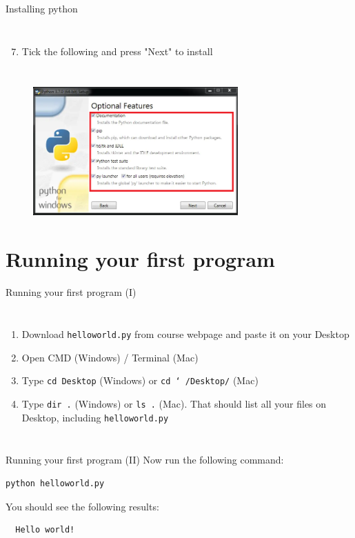 \documentclass[10pt,xcolor={table,dvipsnames},t]{beamer}
\begin{document}
\begin{frame}{Installing python}
  \begin{columns}
    \begin{enumerate}[Step 1:]
      \setcounter{enumi}{6}
      \item Tick the following and press "Next" to install
    \end{enumerate}
  \end{columns}
  \vspace{1mm}
  \begin{figure}
    \includegraphics[width=0.7\textwidth]{img/optional-feature.png}
  \end{figure}
\end{frame}

\section{Running your first program}
\begin{frame}{Running your first program (I)}
  \begin{columns}
    \begin{enumerate}[Step 1:]
      \item Download \texttt{helloworld.py} from course webpage and paste it on your Desktop
      \item Open CMD (Windows) / Terminal (Mac) 
      \item Type \texttt{cd Desktop} (Windows) or \texttt{cd \char`~/Desktop/} (Mac)
      \item Type \texttt{dir .} (Windows) or \texttt{ls .} (Mac). That should list all your files on Desktop, including \texttt{helloworld.py}
    \end{enumerate}
  \end{columns}
\end{frame}

\begin{frame}[fragile]{Running your first program (II)}
  Now run the following command:

  \begin{lstlisting}[language=Bash]
python helloworld.py
\end{lstlisting}
\vspace{1mm}
You should see the following results:
  \begin{lstlisting}
  Hello world!\end{lstlisting}
\end{frame}
\end{document}
